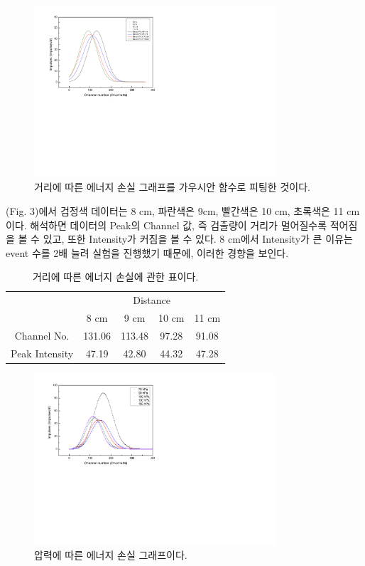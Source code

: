 \documentclass[a4paper, 10pt, nanum]{CSUniSchoolLabReport}
\begin{document}
	\begin{figure}[htb!]
		\centering
		\includegraphics[viewport=1mm 99mm 180mm 200mm, width=9cm, clip=true]{fig3.pdf}
		\caption{거리에 따른 에너지 손실 그래프를 가우시안 함수로 피팅한 것이다.}
		\label{fig:3}
	\end{figure}

	(Fig. 3)에서 검정색 데이터는 8 cm, 파란색은 9cm, 빨간색은 10 cm, 초록색은 11 cm이다. 해석하면 데이터의 Peak의 Channel 값, 즉 검출량이 거리가 멀어질수록 적어짐을 볼 수 있고, 또한 Intensity가 커짐을 볼 수 있다. 8 cm에서 Intensity가 큰 이유는 event 수를 2배 늘려 실험을 진행했기 때문에, 이러한 경향을 보인다.

	\begin{table}[htb!]
		\label{tab:1}
		\centering
		\caption{거리에 따른 에너지 손실에 관한 표이다.}
		\begin{tabular}{c|cccc}
			\noalign{\smallskip}\noalign{\smallskip}\hline\hline
			\multirow{2}{*}{Data} &  \multicolumn{4}{c}{Distance} \\
			\cline{2-5}
				& 8 cm & 9 cm & 10 cm & 11 cm \\
			\hline
				Channel No. & 131.06 & 113.48 & 97.28 & 91.08 \\
				Peak Intensity & 47.19 & 42.80 & 44.32 & 47.28 \\
			\hline
			\hline
		\end{tabular}
	\end{table}


	\begin{figure}[htb!]
		\centering
		\includegraphics[viewport=1mm 99mm 180mm 200mm, width=9cm, clip=true]{fig4.pdf}
		\caption{압력에 따른 에너지 손실 그래프이다.}
		\label{fig:4}
	\end{figure}
\end{document}
